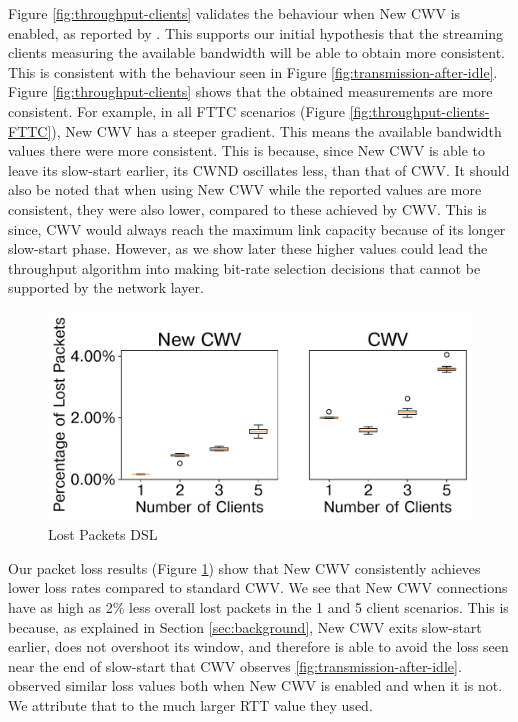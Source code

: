 \documentclass[10pt,sigconf,anonymous]{acmart}
\begin{document}
Figure \ref{fig:throughput-clients} validates the behaviour when New CWV is enabled, as reported by \cite{Nazir-2014-performance-evaluation-congestion-window-validation-dash-newcwv}. This supports our initial hypothesis that the streaming clients measuring the available bandwidth will be able to obtain more consistent. This is consistent with the behaviour seen in Figure \ref{fig:transmission-after-idle}. Figure \ref{fig:throughput-clients} shows that the obtained measurements are more consistent. For example, in all FTTC scenarios (Figure \ref{fig:throughput-clients-FTTC}), New CWV has a steeper gradient. This means the available bandwidth values there were more consistent. This is because, since New CWV is able to leave its slow-start earlier, its CWND oscillates less, than that of CWV. It should also be noted that when using New CWV while the reported values are more consistent, they were also lower, compared to these achieved by CWV. This is since, CWV would always reach the maximum link capacity because of its longer slow-start phase. However, as we show later these higher values could lead the throughput algorithm into making bit-rate selection decisions that cannot be supported by the network layer.

\begin{figure}[t!]
  \centering
  \includegraphics[width=.45\textwidth]{figures/lost_packets.pdf}
  \caption{Lost Packets DSL}
  \label{fig:lost-packets}
\end{figure}

Our packet loss results (Figure \ref{fig:lost-packets}) show that New CWV consistently achieves lower loss rates compared to standard CWV. We see that New CWV connections have as high as 2\% less overall lost packets in the 1 and 5 client scenarios. This is because, as explained in Section \ref{sec:background}, New CWV exits slow-start earlier, does not overshoot its window, and therefore is able to avoid the loss seen near the end of slow-start that CWV observes \ref{fig:transmission-after-idle}. \cite{Nazir-2014-performance-evaluation-congestion-window-validation-dash-newcwv} observed similar loss values both when New CWV is enabled and when it is not. We attribute that to the much larger RTT value they used.
\end{document}
